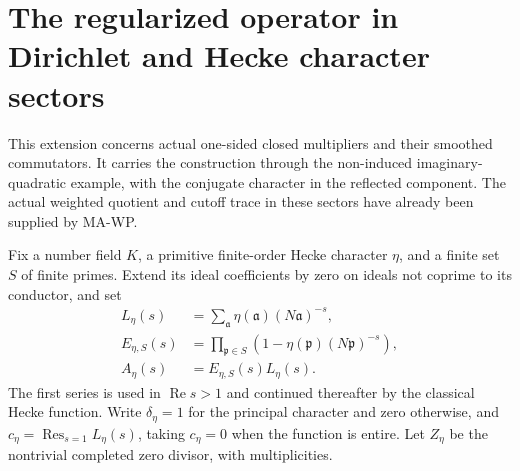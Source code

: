 \section{The regularized operator in Dirichlet and Hecke character sectors}
\label{sec:regularized-characters}

This extension concerns actual one-sided closed multipliers and their
smoothed commutators. It carries the construction through the
non-induced imaginary-quadratic example, with the conjugate character
in the reflected component. The actual weighted quotient and cutoff
trace in these sectors have already been supplied by MA-WP.

Fix a number field $K$, a primitive finite-order Hecke character
$\eta$, and a finite set $S$ of finite primes. Extend its ideal
coefficients by zero on ideals not coprime to its conductor, and set
\[
 \begin{aligned}
 L_\eta(s)&=\sum_{\mathfrak a}\eta(\mathfrak a)
                                       (N\mathfrak a)^{-s},\\
 E_{\eta,S}(s)&=\prod_{\mathfrak p\in S}
                       (1-\eta(\mathfrak p)(N\mathfrak p)^{-s}),\\
 A_\eta(s)&=E_{\eta,S}(s)L_\eta(s).
 \end{aligned}
 \tag{MA-RS.40}
\]
The first series is used in $\operatorname{Re}s>1$ and continued
thereafter by the classical Hecke function. Write
$\delta_\eta=1$ for the principal character and zero otherwise,
and $c_\eta=\operatorname{Res}_{s=1}L_\eta(s)$, taking
$c_\eta=0$ when the function is entire. Let $Z_\eta$ be the
nontrivial completed zero divisor, with multiplicities.

